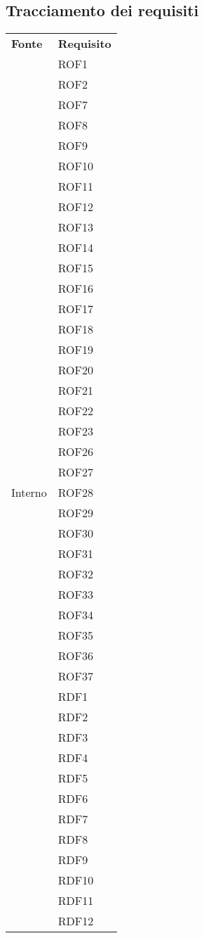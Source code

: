 \subsection{Tracciamento dei requisiti}
\begin{longtable}{| p{5cm} | p{5cm} |}
		\rowcolor{LightBlue}
		\color{white}\bfseries Fonte & \color{white}\bfseries Requisito \\[0.25cm]
\multirow[t]{61}{*}{Interno}		
				& 	ROF1 \\
				&	ROF2 \\
				&	ROF7 \\
				&	ROF8 \\
				&	ROF9 \\
				&	ROF10 \\
				&	ROF11 \\
				&	ROF12 \\
				&	ROF13 \\
				&	ROF14 \\
				&	ROF15 \\
				&	ROF16 \\
				&	ROF17 \\
				&	ROF18 \\
				&	ROF19 \\
				& 	ROF20 \\
				& 	ROF21 \\
				& 	ROF22 \\
				& 	ROF23 \\
				& 	ROF26 \\
				& 	ROF27 \\
				& 	ROF28 \\
				& 	ROF29 \\
				& 	ROF30 \\
				& 	ROF31 \\
				& 	ROF32 \\
				& 	ROF33 \\
				& 	ROF34 \\
				& 	ROF35 \\
				& 	ROF36 \\
				& 	ROF37 \\
				
				&	RDF1 \\
				&	RDF2 \\
				&	RDF3 \\
				&	RDF4 \\
				&	RDF5 \\
				&	RDF6 \\
				&	RDF7 \\
				&	RDF8 \\
				&	RDF9 \\
				&	RDF10 \\
				&	RDF11 \\
				&	RDF12 \\


\end{longtable}
